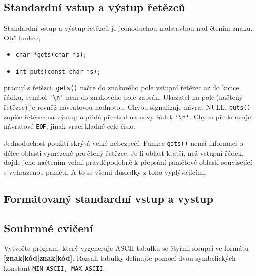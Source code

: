     \subsection{Standardní vstup a výstup řetězců}
      Standardní vstup a výstup řetězců je jednoduchou nadstavbou nad čtením znaku. Obě funkce,
      \begin{itemize}
        \item \lstinline[basicstyle=\ttfamily]!char *gets(char *s);!
        \item \lstinline[basicstyle=\ttfamily]!int puts(const char *s);!
      \end{itemize}
      pracují s řetězci. \texttt{gets()} načte do znakového pole vstupní řetězec az do konce řádku, 
      symbol  \lstinline[basicstyle=\ttfamily]!'\n'! není do znakového pole zapsán. Ukazatel na 
      pole (načtený řetězec) je rovněž návratovou hodnotou. Chybu signalizuje návrat NULL. 
      \texttt{puts()} 
      zapíše řetězec na výstup a přidá přechod na novy řádek       
      \lstinline[basicstyle=\ttfamily]!'\n'!. Chybu představuje návratové \texttt{EOF}, jinak vrací 
      kladné cele číslo.
  
      Jednoduchost použití skrývá velké nebezpečí. Funkce \texttt{gets()} nemá informaci o délce 
      oblasti vymezené pro čtený řetězec. Je-li oblast kratší, než vstupní řádek, dojde jeho 
      načtením velmi pravděpodobně k přepsání paměťové oblasti související s vyhrazenou pamětí. A 
      to se všemi důsledky z toho vyplývajícími.
  
    \subsection{Formátovaný standardní vstup a vystup}
    \subsection{Souhrnné cvičení}
      \begin{example}Vytvořte program, který vygeneruje ASCII tabulku se čtyřmi sloupci ve formátu 
      \textbf{[znak|kód|znak|kód]}. Rozsah tabulky definujte pomocí dvou symbolických konstant 
      \lstinline[basicstyle=\ttfamily]!MIN_ASCII, MAX_ASCII!. 
  
        
      \end{example} 

\printbibliography[title={Seznam literatury}, heading=subbibliography]
